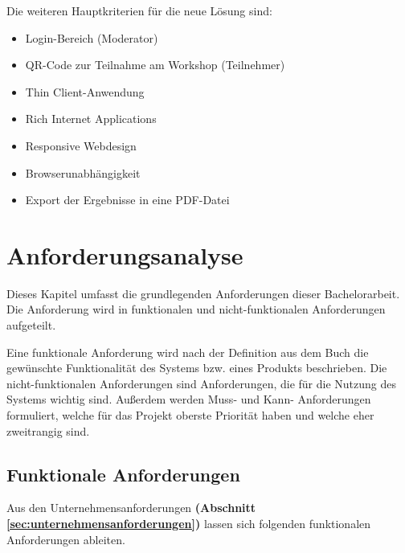 Die weiteren Hauptkriterien für die neue Lösung sind:
\begin{itemize}
\item Login-Bereich (Moderator)
\item QR-Code zur Teilnahme am Workshop (Teilnehmer)
\item Thin Client-Anwendung
\item Rich Internet Applications
\item Responsive Webdesign 
\item Browserunabhängigkeit
\item Export der Ergebnisse in eine PDF-Datei
\end{itemize}

\section{Anforderungsanalyse}
\label{sec:anforderungsanalyse}
Dieses Kapitel umfasst die grundlegenden Anforderungen dieser Bachelorarbeit. Die Anforderung wird in funktionalen und nicht-funktionalen Anforderungen aufgeteilt.\bigskip

Eine funktionale Anforderung wird nach der Definition aus dem Buch \cite{Balzert2010} die gewünschte Funktionalität des Systems bzw. eines Produkts beschrieben. Die nicht-funktionalen Anforderungen sind Anforderungen, die für die Nutzung des Systems wichtig sind. Außerdem werden Muss- und Kann- Anforderungen formuliert, welche für das Projekt oberste Priorität haben und welche eher zweitrangig sind.

\subsection{Funktionale Anforderungen}
\label{sec:funktionale anforderungen}
Aus den Unternehmensanforderungen \textbf{(Abschnitt \ref{sec:unternehmensanforderungen})} lassen sich folgenden funktionalen Anforderungen ableiten.

